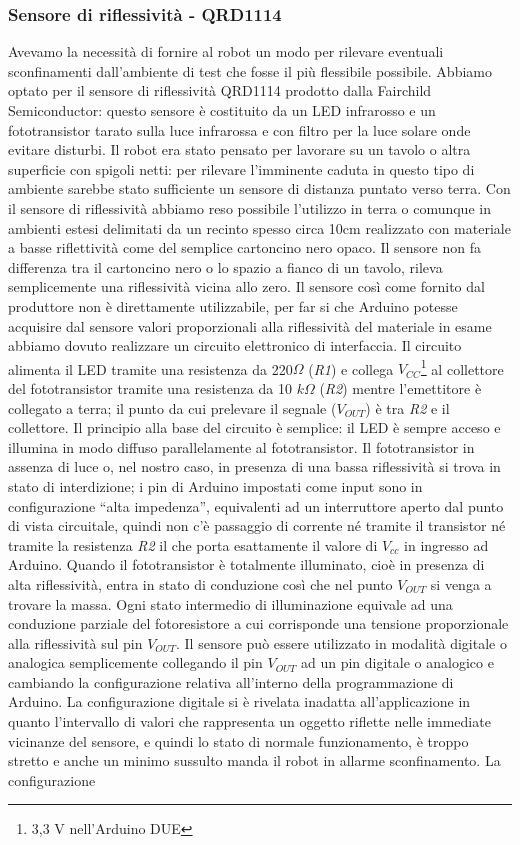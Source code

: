 \subsubsection{Sensore di riflessività - QRD1114}
Avevamo la necessità di fornire al robot un modo per rilevare eventuali sconfinamenti dall'ambiente di test che fosse il più flessibile possibile. Abbiamo optato per il sensore di riflessività QRD1114 prodotto dalla Fairchild Semiconductor: questo sensore è costituito da un LED infrarosso e un fototransistor tarato sulla luce infrarossa e con filtro per la luce solare onde evitare disturbi. Il robot era stato pensato per lavorare su un tavolo o altra superficie con spigoli netti: per rilevare l'imminente caduta in questo tipo di ambiente sarebbe stato sufficiente un sensore di distanza puntato verso terra. Con il sensore di riflessività abbiamo reso possibile l'utilizzo in terra o comunque in ambienti estesi delimitati da un recinto spesso circa 10cm realizzato con materiale a basse riflettività come del semplice cartoncino nero opaco. Il sensore non fa differenza tra il cartoncino nero o lo spazio a fianco di un tavolo, rileva semplicemente una riflessività vicina allo zero. Il sensore così come fornito dal produttore non è direttamente utilizzabile, per far si che Arduino potesse acquisire dal sensore valori proporzionali alla riflessività del materiale in esame abbiamo dovuto realizzare un circuito elettronico di interfaccia. Il circuito alimenta il LED tramite una resistenza da 220$\Omega$ (\textit{R1}) e collega $V_{CC}$\footnote{3,3 V nell'Arduino DUE} al collettore del fototransistor tramite una resistenza da 10 $k\Omega$ (\textit{R2}) mentre l'emettitore è collegato a terra; il punto da cui prelevare il segnale ($V_{OUT}$) è tra \textit{R2} e il collettore. Il principio alla base del circuito è semplice: il LED è sempre acceso e illumina in modo diffuso parallelamente al fototransistor. Il fototransistor in assenza di luce o, nel nostro caso, in presenza di una bassa riflessività si trova in stato di interdizione; i pin di Arduino impostati come input sono in configurazione ``alta impedenza'', equivalenti ad un interruttore aperto dal punto di vista circuitale, quindi non c'è passaggio di corrente né tramite il transistor né tramite la resistenza \textit{R2} il che porta esattamente il valore di $V_{cc}$ in ingresso ad Arduino. Quando il fototransistor è totalmente illuminato, cioè in presenza di alta riflessività, entra in stato di conduzione così che nel punto $V_{OUT}$ si venga a trovare la massa. Ogni stato intermedio di illuminazione equivale ad una conduzione parziale del fotoresistore a cui corrisponde una tensione proporzionale alla riflessività sul pin $V_{OUT}$. Il sensore può essere utilizzato in modalità digitale o analogica semplicemente collegando il pin $V_{OUT}$ ad un pin digitale o analogico e cambiando la configurazione relativa all'interno della programmazione di Arduino. La configurazione digitale si è rivelata inadatta all'applicazione in quanto l'intervallo di valori che rappresenta un oggetto riflette nelle immediate vicinanze del sensore, e quindi lo stato di normale funzionamento, è troppo stretto e anche un minimo sussulto manda il robot in allarme sconfinamento. La configurazione 